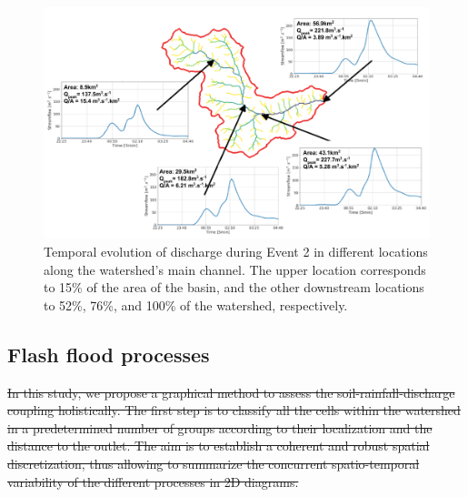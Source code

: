 \documentclass[hess, manuscript]{copernicus}
\providecommand{\DIFadd}[1]{{\protect\color{blue}\uwave{#1}}} %
\providecommand{\DIFdel}[1]{{\protect\color{red}\sout{#1}}}                      %
\providecommand{\DIFdelbegin}{} %
\providecommand{\DIFdelend}{} %
\providecommand{\DIFaddFL}[1]{\DIFadd{#1}} %
\providecommand{\DIFaddbeginFL}{} %
\providecommand{\DIFaddendFL}{} %
\begin{document}
\begin{figure}[t]
\centering
\includegraphics[width =12cm]{Figures/Evolucion_evento.png}
\caption{Temporal evolution of discharge during Event 2 in different locations along the watershed's main channel. The upper location corresponds to 15\% of the area of the basin, and the other downstream locations \DIFaddbeginFL \DIFaddFL{correspond }\DIFaddendFL to 52\%, 76\%, and 100\% of the watershed, respectively.}
\label{fig:dischargeEvent2}
\end{figure}

\subsection{Flash flood processes}

\DIFdelbegin \DIFdel{In this study, we propose a graphical method to assess the soil-rainfall-discharge coupling holistically. The first step is to classify all the cells within the watershed in a predetermined number of groups according to their localization and the distance to the outlet. The aim is to establish a coherent and robust spatial discretization, thus allowing to summarize the concurrent spatio-temporal variability of the different processes in 2D diagrams.}%

\DIFdelend %
\end{document}
